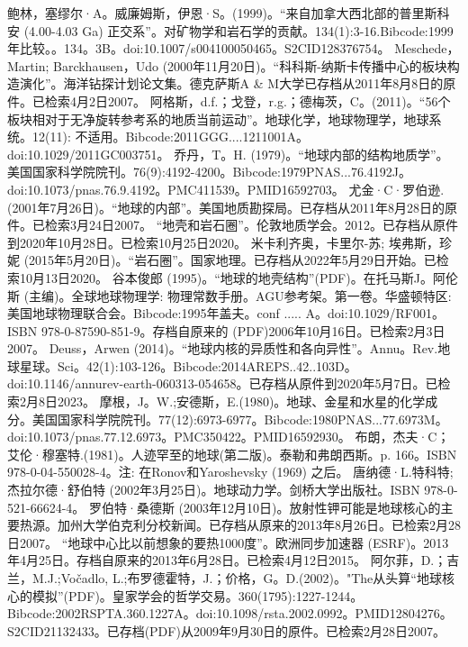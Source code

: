 \begin{enumerate}
 鲍林，塞缪尔·A。威廉姆斯，伊恩·S。(1999)。“来自加拿大西北部的普里斯科安 (4.00-4.03 Ga) 正交系”。对矿物学和岩石学的贡献。134(1):3-16.Bibcode:1999年比较。。134。3B。doi:10.1007/s004100050465。S2CID128376754。 
 Meschede，Martin; Barckhausen，Udo (2000年11月20日)。“科科斯-纳斯卡传播中心的板块构造演化”。海洋钻探计划论文集。德克萨斯A & M大学已存档从2011年8月8日的原件。已检索4月2日2007。
 阿格斯，d.f.；戈登，r.g.；德梅茨，C。(2011)。“56个板块相对于无净旋转参考系的地质当前运动”。地球化学，地球物理学，地球系统。12(11): 不适用。Bibcode:2011GGG....1211001A。doi:10.1029/2011GC003751。
 乔丹，T。H. (1979)。“地球内部的结构地质学”。美国国家科学院院刊。76(9):4192-4200。Bibcode:1979PNAS...76.4192J。doi:10.1073/pnas.76.9.4192。PMC411539。PMID16592703。  
 尤金·C·罗伯逊.(2001年7月26日)。“地球的内部”。美国地质勘探局。已存档从2011年8月28日的原件。已检索3月24日2007。
 “地壳和岩石圈”。伦敦地质学会。2012。已存档从原件到2020年10月28日。已检索10月25日2020。
 米卡利齐奥，卡里尔-苏; 埃弗斯，珍妮 (2015年5月20日)。“岩石圈”。国家地理。已存档从2022年5月29日开始。已检索10月13日2020。
 谷本俊郎 (1995)。“地球的地壳结构”(PDF)。在托马斯J。阿伦斯 (主编)。全球地球物理学: 物理常数手册。AGU参考架。第一卷。华盛顿特区: 美国地球物理联合会。Bibcode:1995年盖夫。conf ..... A。doi:10.1029/RF001。ISBN  978-0-87590-851-9。存档自原来的 (PDF)2006年10月16日。已检索2月3日2007。
 Deuss，Arwen (2014)。“地球内核的异质性和各向异性”。Annu。Rev.地球星球。Sci。42(1):103-126。Bibcode:2014AREPS..42..103D。doi:10.1146/annurev-earth-060313-054658。已存档从原件到2020年5月7日。已检索2月8日2023。
 摩根，J。W.;安德斯，E.(1980)。地球、金星和水星的化学成分。美国国家科学院院刊。77(12):6973-6977。Bibcode:1980PNAS...77.6973M。doi:10.1073/pnas.77.12.6973。PMC350422。PMID16592930。  
 布朗，杰夫·C；艾伦·穆塞特.(1981)。人迹罕至的地球(第二版)。泰勒和弗朗西斯。p. 166。ISBN 978-0-04-550028-4。注: 在Ronov和Yaroshevsky (1969) 之后。
 唐纳德·L.特科特; 杰拉尔德·舒伯特 (2002年3月25日)。地球动力学。剑桥大学出版社。ISBN 978-0-521-66624-4。
 罗伯特·桑德斯 (2003年12月10日)。放射性钾可能是地球核心的主要热源。加州大学伯克利分校新闻。已存档从原来的2013年8月26日。已检索2月28日2007。
 “地球中心比以前想象的要热1000度”。欧洲同步加速器 (ESRF)。2013年4月25日。存档自原来的2013年6月28日。已检索4月12日2015。
 阿尔菲，D.；吉兰，M.J.;Vočadlo, L.;布罗德霍特，J.；价格，G。D.(2002)。"The从头算“地球核心的模拟”(PDF)。皇家学会的哲学交易。360(1795):1227-1244。Bibcode:2002RSPTA.360.1227A。doi:10.1098/rsta.2002.0992。PMID12804276。S2CID21132433。已存档(PDF)从2009年9月30日的原件。已检索2月28日2007。   
 \end{enumerate}